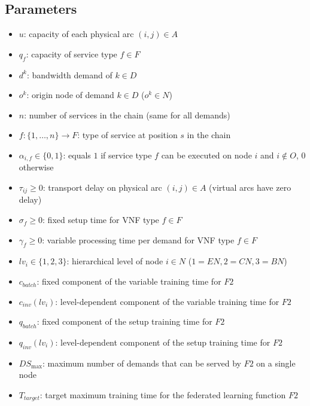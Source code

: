 \documentclass{article}
\begin{document}
\subsection*{Parameters}
\begin{itemize}
    \item $u$: capacity of each physical arc $(i,j) \in A$
    \item $q_f$: capacity of service type $f \in F$
    \item $d^k$: bandwidth demand of $k \in D$
    \item $o^k$: origin node of demand $k \in D$ ($o^k \in N$)
    \item $n$: number of services in the chain (same for all demands)
    \item $f: \{1, \dots, n\} \to F$: type of service at position $s$ in the chain
    \item $\alpha_{i,f} \in \{0,1\}$: equals $1$ if service type $f$ can be executed on node $i$ and $i \notin O$, $0$ otherwise
    \item $\tau_{ij} \geq 0$: transport delay on physical arc $(i,j) \in A$ (virtual arcs have zero delay)
    \item $\sigma_f \geq 0$: fixed setup time for VNF type $f \in F$
    \item $\gamma_f \geq 0$: variable processing time per demand for VNF type $f \in F$
    \item $lv_i \in \{1, 2, 3\}$: hierarchical level of node $i \in N$ ($1=EN, 2=CN, 3=BN$)
    \item $c_{batch}$: fixed component of the variable training time for $F2$
    \item $c_{inv}(lv_i)$: level-dependent component of the variable training time for $F2$
    \item $q_{batch}$: fixed component of the setup training time for $F2$
    \item $q_{inv}(lv_i)$: level-dependent component of the setup training time for $F2$
    \item $DS_{\max}$: maximum number of demands that can be served by $F2$ on a single node
    \item $T_{target}$: target maximum training time for the federated learning function $F2$
\end{itemize}
\end{document}
